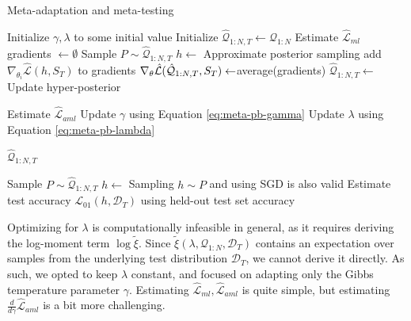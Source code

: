 \documentclass{article}
\theoremstyle{definition}
\begin{document}
\begin{algorithm}[H]
	\caption{Meta-adaptation and meta-testing}
	\label{alg1}
	\small
	\begin{algorithmic}
		\State Initialize $\gamma, \lambda$ to some initial value 
		\State Initialize $\hat{\mathcal{Q}}_{1:N, T}\leftarrow \mathcal{Q}_{1:N}$
		\State Estimate $\hat{\mathcal{L}}_{ml}$
			\State gradients $\leftarrow \emptyset$
				\State Sample $P\sim \hat{\mathcal{Q}}_{1:N, T}$
				\State $h\leftarrow$  \Comment Approximate posterior sampling
				\State add $\nabla_{\theta_i} \hat{\mathcal{L}}(h, S_T)$ to gradients
			\EndFor
			\State $\nabla_\theta \hat{\mathcal{L}}(\hat{\cal Q}_{1:N,T}, S_T)\leftarrow$average(gradients)
			\State $\hat{\mathcal{Q}}_{1:N, T}\leftarrow$  \Comment Update hyper-posterior
			
			\State Estimate $\hat{\mathcal{L}}_{aml}$
			\State Update $\gamma$ using Equation \ref{eq:meta-pb-gamma}
			\State Update $\lambda$ using Equation \ref{eq:meta-pb-lambda}
			
		\EndWhile
		\State \Return $\hat{\mathcal{Q}}_{1:N, T}$
		\EndFunction
		
		\State Sample $P\sim \hat{\mathcal{Q}}_{1:N, T}$
		\State $h\leftarrow$  \Comment Sampling $h\sim P$ and using SGD is also valid
		\State Estimate test accuracy $\mathcal{L}_{01}(h, \mathcal{D}_T)$ using held-out test set
		\State \Return accuracy
		\EndFunction
	\end{algorithmic}
\end{algorithm}

Optimizing for $\lambda$ is computationally infeasible in general, as it requires deriving the log-moment term $\log\tilde{\xi}$. Since $\tilde{\xi}(\lambda, \mathcal{Q}_{1:N},\mathcal{D}_T)$ contains an expectation over samples from the underlying test distribution $\mathcal{D}_T$, we cannot derive it directly. As such, we opted to keep $\lambda$ constant, and focused on adapting only the Gibbs temperature parameter $\gamma$.
Estimating $\hat{\mathcal{L}}_{ml},\hat{\mathcal{L}}_{aml}$ is quite simple, but estimating $\frac{d}{d\gamma}\hat{\mathcal{L}}_{aml}$ is a bit more challenging.
\end{document}
